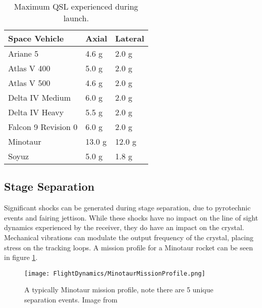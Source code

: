 \begin{table}[!htb]
\centering
\begin{tabular}{|l|l|l|}
\hline
\rowcolor[HTML]{C0C0C0} 
Space Vehicle       & Axial                   & Lateral                \\ \hline
Ariane 5            & 4.6 g \cite{Ariane}     & 2.0 g \cite{Ariane}    \\ \hline
\rowcolor[HTML]{EFEFEF} 
Atlas V 400         & 5.0 g \cite{AtlasV}     & 2.0 g \cite{AtlasV}    \\ \hline
Atlas V 500         & 4.6 g \cite{AtlasV}     & 2.0 g \cite{AtlasV}    \\ \hline
\rowcolor[HTML]{EFEFEF} 
Delta IV Medium     & 6.0 g \cite{DeltaIV}    & 2.0 g \cite{DeltaIV}   \\ \hline
Delta IV Heavy      & 5.5 g \cite{DeltaIV}    & 2.0 g \cite{DeltaIV}   \\ \hline
\rowcolor[HTML]{EFEFEF} 
Falcon 9 Revision 0 & 6.0 g \cite{Falcon9}    & 2.0 g \cite{Falcon9}   \\ \hline
Minotaur            & 13.0 g  \cite{Minotaur} & 12.0 g \cite{Minotaur} \\ \hline
\rowcolor[HTML]{EFEFEF} 
Soyuz               & 5.0 g \cite{Soyuz}      & 1.8 g \cite{Soyuz}     \\ \hline
\end{tabular}
\caption{Maximum \ac{QSL} experienced during launch.}
\label{QSLTable}
\end{table}



\subsection{Stage Separation}

Significant shocks can be generated during stage separation, due to pyrotechnic events and fairing jettison\cite{AtlasV,Ariane,DeltaIV}. While these shocks have no impact on the line of sight dynamics experienced by the receiver, they do have an impact on the crystal. Mechanical vibrations can modulate the output frequency of the crystal, placing stress on the tracking loops. A mission profile for a Minotaur rocket can be seen in figure \ref{fig:MinotaurMissionProfile}.


\begin{figure}[!htb] 
    \centering
    \texttt{[image: FlightDynamics/MinotaurMissionProfile.png]} 
    \caption{A typically Minotaur mission profile, note there are 5 unique separation events. Image from \cite{Minotaur}}
    \label{fig:MinotaurMissionProfile}
\end{figure}

